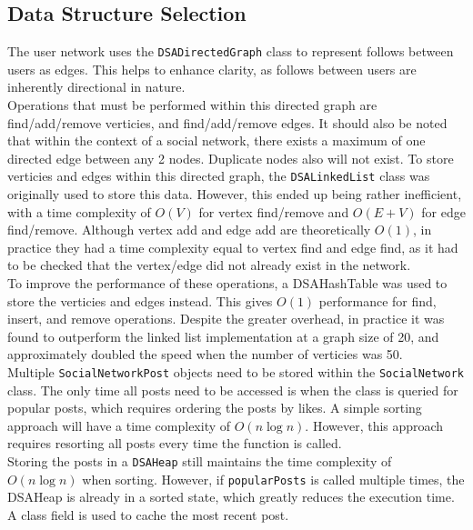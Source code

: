 \documentclass{article}
\begin{document}
\subsection{Data Structure Selection}

The user network uses the \texttt{DSADirectedGraph} class to represent follows between users
as edges. This helps to enhance clarity, as follows between users are inherently directional in nature.\\

Operations that must be performed within this directed graph are find/add/remove verticies,
and find/add/remove edges. It should also be noted that within the context of a social network,
there exists a maximum of one directed edge between any 2 nodes. Duplicate nodes also will not
exist.
To store verticies and edges within this directed graph, the \texttt{DSALinkedList} class was originally
used to store this data. However, this ended up being rather inefficient, with a time complexity of
$O\left(V\right)$ for vertex find/remove and $O\left(E + V\right)$ for edge find/remove.
Although vertex add and edge add are theoretically $O\left(1\right)$, in practice they had a time complexity
equal to vertex find and edge find, as it had to be checked that the vertex/edge did not already exist in the network.\\

To improve the performance of these operations, a DSAHashTable was used to store the verticies and edges instead.
This gives $O\left(1\right)$
performance for find, insert, and remove operations. Despite the greater overhead, in practice it was found to outperform
the linked list implementation at a graph size of 20, and approximately doubled the speed when the number of verticies was 50.\\

Multiple \texttt{SocialNetworkPost} objects need to be stored within the \texttt{SocialNetwork} class.
The only time all posts need to be accessed
is when the class is queried for popular posts, which requires ordering the posts by likes.
A simple sorting approach will have a time complexity of $O\left(n\log n\right)$. However, this
approach requires resorting all posts every time the function is called.\\

Storing the posts in a \texttt{DSAHeap} still maintains
the time complexity of $O\left(n\log n\right)$ when sorting. However, if \texttt{popularPosts}
is called multiple times, the DSAHeap is already in a sorted state, which greatly reduces the execution time.
A class field is used to cache the most recent post.\\
\end{document}
